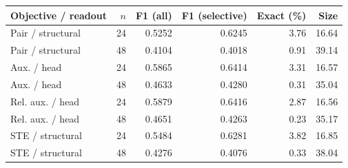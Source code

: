\begin{tabular}{lrrrrr}
\toprule
Objective / readout & $n$ & F1 (all) & F1 (selective) & Exact (\%) & Size \\
\midrule
Pair / structural & 24 & 0.5252 & 0.6245 & 3.76 & 16.64 \\
Pair / structural & 48 & 0.4104 & 0.4018 & 0.91 & 39.14 \\
Aux. / head & 24 & 0.5865 & 0.6414 & 3.31 & 16.57 \\
Aux. / head & 48 & 0.4633 & 0.4280 & 0.31 & 35.04 \\
Rel. aux. / head & 24 & 0.5879 & 0.6416 & 2.87 & 16.56 \\
Rel. aux. / head & 48 & 0.4651 & 0.4263 & 0.23 & 35.17 \\
STE / structural & 24 & 0.5484 & 0.6281 & 3.82 & 16.85 \\
STE / structural & 48 & 0.4276 & 0.4076 & 0.33 & 38.04 \\
\bottomrule
\end{tabular}
